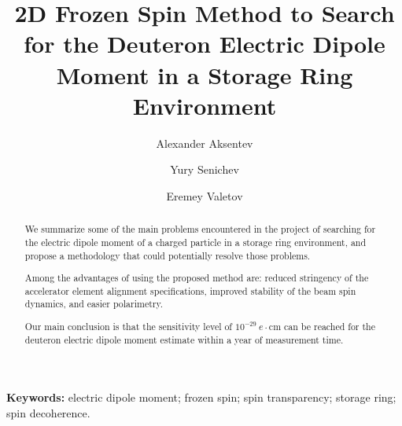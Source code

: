 \documentclass[]{elsarticle}
\begin{document}
\title{2D Frozen Spin Method to Search for the Deuteron Electric Dipole Moment in a Storage Ring Environment}

\author[FZJ,INR,MEPHI]{Alexander Aksentev}

\author[INR]{Yury Senichev}

\author[MSU]{Eremey Valetov}


\address[FZJ]{Institut f\"ur Kernphysik (IKP-2), Forschungszentrum J\"ulich,
  J\"ulich, Germany}
\address[INR]{Institute for Nuclear Research of the Russian Academy of Sciences,
  Moscow, Russia}
\address[MEPHI]{National Research Nuclear University ``MEPhI,''
  Moscow, Russia}
\address[MSU]{Department of Physics and Astronomy, Michigan State University,
  MI 48824, USA}


\begin{abstract}
  We summarize some of the main problems encountered in the project of searching
  for the electric dipole moment of a charged particle in a storage ring environment, and propose
  a methodology that could potentially resolve those problems.

  Among the advantages of using the proposed method are: reduced stringency of the accelerator
  element alignment specifications, improved stability of the beam spin dynamics, and easier polarimetry.

  Our main conclusion is that the sensitivity level of $10^{-29}~e\cdot$cm can be reached for
  the deuteron electric dipole moment estimate within a year of measurement time.
\end{abstract}


\maketitle

\textbf{Keywords:} electric dipole moment; frozen spin; spin transparency; storage ring; spin decoherence.
\end{document}
